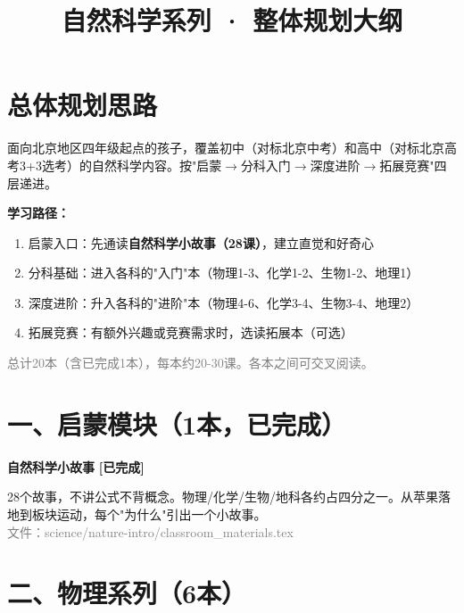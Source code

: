 \documentclass[a4paper,12pt]{ctexart}
\title{\textcolor{blue!70!black}{\Huge\textbf{自然科学系列 · 整体规划大纲}}}
\author{}
\date{}
\newcommand{\done}{\textcolor{donegreen}{\textbf{[已完成]}}}
\begin{document}
\maketitle
\thispagestyle{empty}

\section*{\textcolor{blue!70!black}{总体规划思路}}

面向北京地区四年级起点的孩子，覆盖初中（对标北京中考）和高中（对标北京高考3+3选考）的自然科学内容。按"启蒙$\rightarrow$分科入门$\rightarrow$深度进阶$\rightarrow$拓展竞赛"四层递进。

\textbf{学习路径：}
\begin{enumerate}
  \item 启蒙入口：先通读\textbf{自然科学小故事（28课）}，建立直觉和好奇心
  \item 分科基础：进入各科的"入门"本（物理1-3、化学1-2、生物1-2、地理1）
  \item 深度进阶：升入各科的"进阶"本（物理4-6、化学3-4、生物3-4、地理2）
  \item 拓展竞赛：有额外兴趣或竞赛需求时，选读拓展本（可选）
\end{enumerate}

\vspace{0.3cm}
\textcolor{gray}{\small 总计20本（含已完成1本），每本约20-30课。各本之间可交叉阅读。}

\newpage

\section*{\textcolor{orange!80!black}{一、启蒙模块（1本，已完成）}}

\vspace{0.2cm}
{\large\textbf{自然科学小故事} \done}
\vspace{0.1cm}

28个故事，不讲公式不背概念。物理/化学/生物/地科各约占四分之一。从苹果落地到板块运动，每个"为什么"引出一个小故事。\\
\textcolor{gray}{文件：science/nature-intro/classroom\_materials.tex}

\vspace{0.5cm}

\section*{\textcolor{orange!80!black}{二、物理系列（6本）}}
\end{document}
